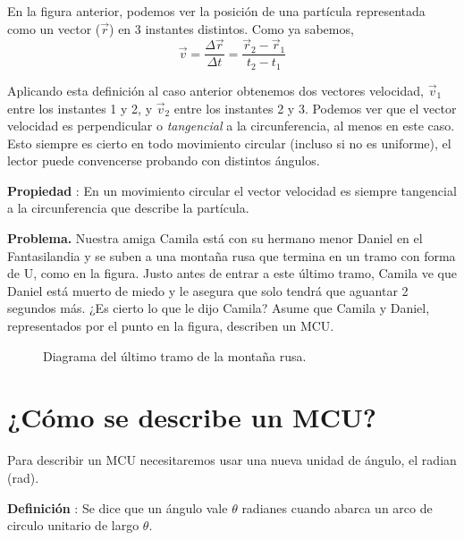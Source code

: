 \documentclass[letterpaper]{article}
\newcommand{\tvecnotsloped}[3]{[->, thick] #1 -- #2 {node[midway, above] {#3}}}
\newcounter{propiedades}
\newcounter{definiciones}
\newcommand{\propi}{\stepcounter{propiedades} \textbf{Propiedad \thepropiedades}: }
\newcommand{\defii}{\stepcounter{definiciones} \textbf{Definición \thedefiniciones}: }
\newenvironment{prop}
{ \begin{framed} \propi}
{ \end{framed} }
\newenvironment{defi}{\begin{framed} \defii}{\end{framed}}
\begin{document}
En la figura anterior, podemos ver la posición de una partícula representada como un vector ($\vec{r}$) en 3 instantes distintos. Como ya sabemos, $$ \vec{v} = \frac{\Delta \vec{r}}{\Delta t} = \frac{\vec{r}_2 - \vec{r}_1}{t_2 - t_1} $$

Aplicando esta definición al caso anterior obtenemos dos vectores velocidad, $\vec{v}_1$ entre los instantes 1 y 2, y $\vec{v}_2$ entre los instantes 2 y 3. Podemos ver que el vector velocidad es perpendicular o \emph{tangencial} a la circunferencia, al menos en este caso. Esto siempre es cierto en todo movimiento circular (incluso si no es uniforme), el lector puede convencerse probando con distintos ángulos. 

\begin{prop}
En un movimiento circular el vector velocidad es siempre tangencial a la circunferencia que describe la partícula.
\end{prop} 

\textbf{Problema.} Nuestra amiga Camila está con su hermano menor Daniel en el Fantasilandia y se suben a una montaña rusa que termina en un tramo con forma de U, como en la figura. Justo antes de entrar a este último tramo, Camila ve que Daniel está muerto de miedo y le asegura que solo tendrá que aguantar 2 segundos más. ¿Es cierto lo que le dijo Camila? Asume que Camila y Daniel, representados por el punto en la figura, describen un MCU.

\pagebreak

\begin{figure}[h]
\centering
{}
\caption{Diagrama del último tramo de la montaña rusa.}
\end{figure}

\section*{¿Cómo se describe un MCU?}

Para describir un MCU necesitaremos usar una nueva unidad de ángulo, el radian (\si{rad}).

\begin{defi}
 Se dice que un ángulo vale $\theta$ radianes cuando abarca un arco de circulo unitario de largo $\theta$.
\end{defi} 
\end{document}
